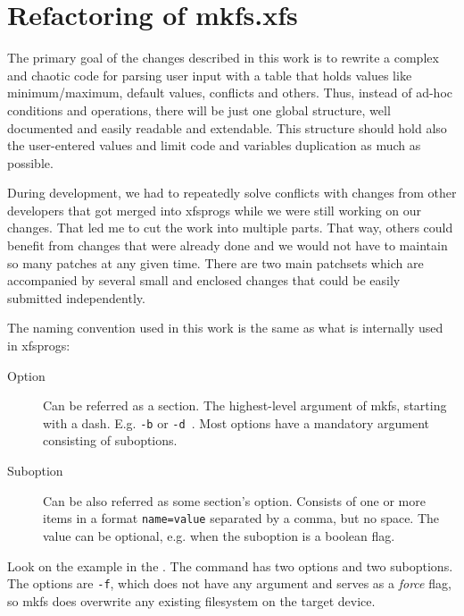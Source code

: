 
\chapter{Refactoring of mkfs.xfs} \label{chap:refactoring}

The primary goal of the changes described in this work is to rewrite a
complex and chaotic code for parsing user input with a table that holds
values like minimum/maximum, default values, conflicts and others. Thus,
instead of ad-hoc conditions and operations, there will be just one global
structure, well documented and easily readable and extendable. This
structure should hold also the user-entered values and limit code and
variables duplication as much as possible.

During development, we had to repeatedly solve conflicts with changes
from other developers that got merged into xfsprogs while we were still
working on our changes. That led me to cut the work into multiple parts.
That way, others could benefit from changes that were already done and we
would not have to maintain so many patches at any given time. There are two
main patchsets which are accompanied by several small and enclosed changes that
could be easily submitted independently.

The naming convention used in this work is the same as what is internally used
in xfsprogs:
\begin{description}
\item[Option] Can be referred as a section. The highest-level argument of
	mkfs, starting with a dash.  E.g. {\tt -b} or {\tt -d }. Most
	options have a mandatory argument consisting of suboptions.
\item[Suboption] Can be also referred as some section's option. Consists
	of one or more items in a format {\tt name=value} separated by a
	comma, but no space. The value can be optional, e.g. when the
	suboption is a boolean flag.
\end{description}

Look on the example in the . The command has
two options and two suboptions. The options are {\tt -f}, which does not
have any argument and serves as a {\em force} flag, so mkfs does overwrite
any existing filesystem on the target device.

